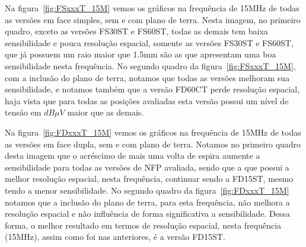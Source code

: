 Na figura~\ref{fig:FSxxxT_15M} vemos os gráficos na frequência de 15MHz de todas as versões em face simples, sem e com plano de terra. Nesta imagem, no primeiro quadro, exceto as versões FS30ST e FS60ST, todas as demais tem baixa sensibilidade e pouca resolução espacial, somente as versões FS30ST e FS60ST, que já possuem um raio maior que 1.5mm são as que apresentam uma boa sensibilidade nesta frequência. No segundo quadro da figura~\ref{fig:FSxxxT_15M}, com a inclusão do plano de terra, notamos que todas as versões melhoram sua sensibilidade, e notamos também que a versão FD60CT perde resolução espacial, haja vista que para todas as posições avaliadas esta versão possui um nível de tensão em $dB \mu V$ maior que as demais. 

Na figura~\ref{fig:FDxxxT_15M} vemos os gráficos na frequência de 15MHz de todas as versões em face dupla, sem e com plano de terra. Notamos no primeiro quadro desta imagem que o acréscimo de mais uma volta de espira aumente a sensibilidade para todas as versões de NFP avaliada, sendo que a que possui a melhor resolução espacial, nesta frequência, continuar sendo a FD15ST, mesmo tendo a menor sensibilidade. No segundo quadro da figura~\ref{fig:FDxxxT_15M} notamos que a inclusão do plano de terra, para esta frequência, não melhora a resolução espacial e não influência de forma significativa a sensibilidade. Dessa forma, o melhor resultado em termos de resolução espacial, nesta frequência (15MHz), assim como foi nas anteriores, é a versão FD15ST.


